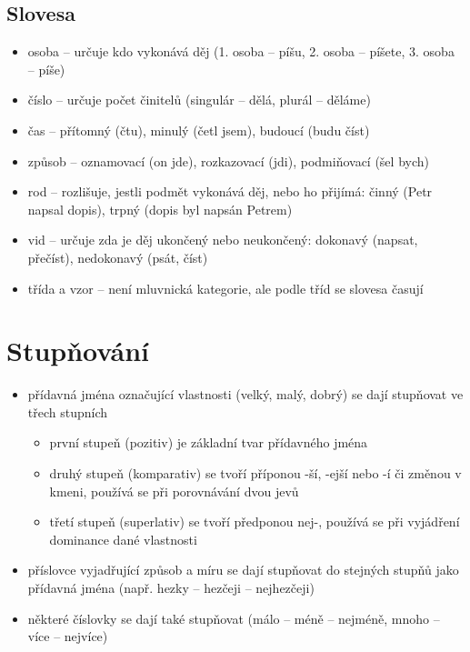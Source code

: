 \documentclass{memoir}
\begin{document}
	\subsection*{Slovesa}
		\begin{itemize}
			\item osoba -- určuje kdo vykonává děj (1. osoba -- píšu, 2. osoba -- píšete, 3. osoba -- píše)
			\item číslo -- určuje počet činitelů (singulár -- dělá, plurál -- děláme)
			\item čas -- přítomný (čtu), minulý (četl jsem), budoucí (budu číst)
			\item způsob -- oznamovací (on jde), rozkazovací (jdi), podmiňovací (šel bych)
			\item rod -- rozlišuje, jestli podmět vykonává děj, nebo ho přijímá: činný (Petr napsal dopis), trpný (dopis byl napsán Petrem)
			\item vid -- určuje zda je děj ukončený nebo neukončený: dokonavý (napsat, přečíst), nedokonavý (psát, číst)
			\item třída a vzor -- není mluvnická kategorie, ale podle tříd se slovesa časují
		\end{itemize}

\section*{Stupňování}
	\begin{itemize}
		\item přídavná jména označující vlastnosti (velký, malý, dobrý) se dají stupňovat ve třech stupních
		\begin{itemize}
			\item první stupeň (pozitiv) je základní tvar přídavného jména
			\item druhý stupeň (komparativ) se tvoří příponou -ší, -ejší nebo -í či změnou v kmeni, používá se při porovnávání dvou jevů
			\item třetí stupeň (superlativ) se tvoří předponou nej-, používá se při vyjádření dominance dané vlastnosti
		\end{itemize}
		\item příslovce vyjadřující způsob a míru se dají stupňovat do stejných stupňů jako přídavná jména (např. hezky -- hezčeji -- nejhezčeji)
		\item některé číslovky se dají také stupňovat (málo -- méně -- nejméně, mnoho -- více -- nejvíce)
	\end{itemize}
\end{document}
